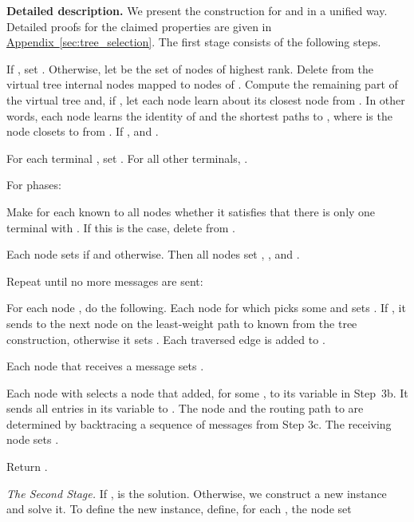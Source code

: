 \documentclass[letterpaper,11pt]{article}
\newcommand{\namedref}[2]{\hyperref[#2]{#1~\ref*{#2}}}
\newcommand{\appendixref}[1]{\namedref{Appendix}{#1}}
\renewcommand{\paragraph}[1]{\smallskip\par\noindent\textbf{#1}}
\begin{document}
\paragraph{Detailed description.}
We present the construction for  and  in a unified
way. Detailed proofs for the claimed properties are given in
\appendixref{sec:tree_selection}. The first stage consists of the following
steps.
\begin{compactenum}
  \item If , set . Otherwise, let  be the set of  nodes of highest rank. Delete from the virtual
  tree internal nodes mapped to nodes of . Compute the remaining part of
  the virtual tree and, if , let each node learn about
  its closest node from . In other words, each node 
   learns the identity of and the shortest paths to
  , where  is
  the node closets to  from . If ,  and
  .
  \item For each terminal , set . For all other
  terminals, .
  \item For  phases:
  \begin{compactenum}
    \item Make for each  known to all nodes whether it
    satisfies that there is only one terminal  with .
    If this is the case, delete  from .
    \item Each node  sets
     if  and
     otherwise. Then
    all nodes set , , and
    .
    \item Repeat until no more messages are sent:
    \begin{compactitem}
      \item For each node , do the following. Each node  for which
       picks some  and sets . If
      , it sends  to the next node on the least-weight path
      to  known from the tree construction, otherwise it sets
      .
      Each traversed edge is added to .
      \item Each node  that receives a message  sets
      .
    \end{compactitem}
    \item Each node  with  selects a node  that
    added, for some ,  to its  variable in Step~3b.
    It sends all entries in its  variable to . The node  and
    the routing path to  are determined by backtracing a sequence of messages
     from Step 3c. The receiving node  sets .
  \end{compactenum}
  \item Return .
\end{compactenum}
\emph{The Second Stage.}
If ,  is the solution.
Otherwise, we construct a new instance and solve it.
To define the new instance,
define, for each , the node set
\end{document}
